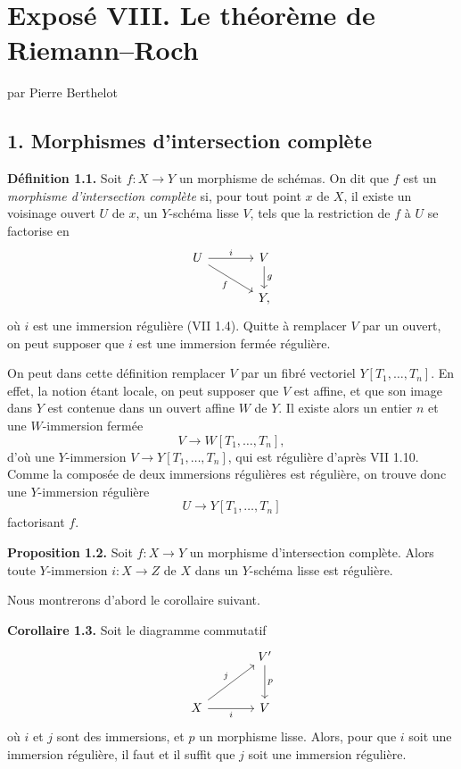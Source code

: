 \documentclass[11pt]{article}
\begin{document}
\providecommand{\etale}{\'etale}
\providecommand{\Ch}{\operatorname{Ch}}


\section*{Exposé VIII. Le théorème de Riemann--Roch}
\begin{center}
par Pierre Berthelot
\end{center}

\subsection*{1. Morphismes d'intersection complète}

\textbf{Définition 1.1.} Soit $f:X\to Y$ un morphisme de schémas. On dit que $f$ est un \emph{morphisme d'intersection complète} si, pour tout point $x$ de $X$, il existe un voisinage ouvert $U$ de $x$, un $Y$-schéma lisse $V$, tels que la restriction de $f$ à $U$ se factorise en
\[
\begin{tikzcd}[column sep=large]
U \arrow[r,"i"] \arrow[dr,"f"'] & V \arrow[d,"g"]\\
& Y,
\end{tikzcd}
\]
où $i$ est une immersion régulière (VII 1.4). Quitte à remplacer $V$ par un ouvert, on peut supposer que $i$ est une immersion fermée régulière.

On peut dans cette définition remplacer $V$ par un fibré vectoriel $Y[T_1,\ldots,T_n]$. En effet, la notion étant locale, on peut supposer que $V$ est affine, et que son image dans $Y$ est contenue dans un ouvert affine $W$ de $Y$. Il existe alors un entier $n$ et une $W$-immersion fermée
\[
V\longrightarrow W[T_1,\ldots,T_n],
\]
d'où une $Y$-immersion $V\to Y[T_1,\ldots,T_n]$, qui est régulière d'après VII 1.10. Comme la composée de deux immersions régulières est régulière, on trouve donc une $Y$-immersion régulière
\[
U\longrightarrow Y[T_1,\ldots,T_n]
\]
factorisant $f$.

\textbf{Proposition 1.2.} Soit $f:X\to Y$ un morphisme d'intersection complète. Alors toute $Y$-immersion $i:X\to Z$ de $X$ dans un $Y$-schéma lisse est régulière.

Nous montrerons d'abord le corollaire suivant.

\textbf{Corollaire 1.3.} Soit le diagramme commutatif
\[
\begin{tikzcd}[column sep=large,row sep=large]
& V' \arrow[d,"p"]\\
X \arrow[ur,"j"] \arrow[r,"i"'] & V
\end{tikzcd}
\]
où $i$ et $j$ sont des immersions, et $p$ un morphisme lisse. Alors, pour que $i$ soit une immersion régulière, il faut et il suffit que $j$ soit une immersion régulière.
\end{document}
